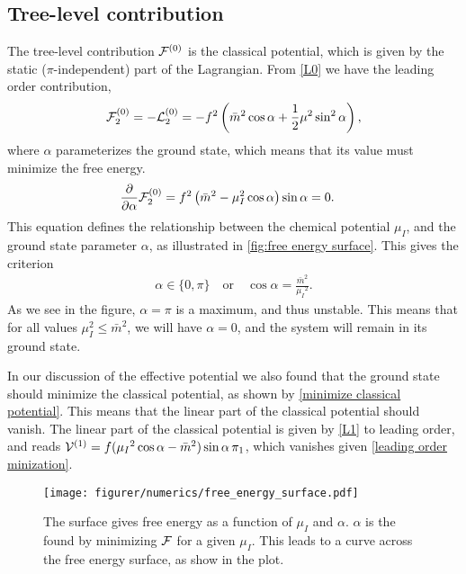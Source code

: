 \subsection*{Tree-level contribution}
The tree-level contribution $\mathcal{F}^{(0)}$ is the classical potential, which is given by the static ($\pi$-independent) part of the Lagrangian.
From \cref{L0} we have the leading order contribution,
\begin{equation}
    \label{leading order contribution free energy}
    \mathcal{F}_2^{(0)}
    = - \mathcal{L}_2^{(0)} 
    = 
    -f^2   
    \left(
        \bar m^2 \cos{\alpha}
        + \frac{1}{2} \mu^2 \sin^2{\alpha}
    \right),
\end{equation}
where $\alpha$ parameterizes the ground state, which means that its value must minimize the free energy.
\begin{align*}
    &\diffp{}{\alpha} \Ef_2^{(0)} 
    = f^2\left(\bar m^2 - \mu_I^2\cos{\alpha}\right)\sin{\alpha}
    = 0.
\end{align*}
This equation defines the relationship between the chemical potential $\mu_I$, and the ground state parameter $\alpha$, as illustrated in \autoref{fig:free energy surface}.
This gives the criterion
\begin{align}
    \label{leading order minization}
    \alpha \in \{0, \pi\} \quad
    \mathrm{or} \quad
    \cos{\alpha} = \frac{\bar m^2}{\mu_I{}^2}.
\end{align}
As we see in the figure, $\alpha = \pi$ is a maximum, and thus unstable.
This means that for all values $\mu_I^2 \leq \bar m^2$, we will have $\alpha = 0$, and the system will remain in its ground state.

In our discussion of the effective potential we also found that the ground state should minimize the classical potential, as shown by \cref{minimize classical potential}.
This means that the linear part of the classical potential should vanish.
The linear part of the classical potential is given by \autoref{L1} to leading order, and reads $\mathcal{V}^{(1)} = f(\mu_I{}^2\cos{\alpha} - \bar m^2)\sin{\alpha} \, \pi_1 $, which vanishes given \cref{leading order minization}.
\begin{figure}[ht]
    \centering
    \texttt{[image: figurer/numerics/free\_energy\_surface.pdf]}
    \caption{The surface gives free energy as a function of $\mu_I$ and $\alpha$. $\alpha$ is the found by minimizing $\mathcal{F}$ for a given $\mu_I$. This leads to a curve across the free energy surface, as show in the plot.}
    \label{fig:free energy surface}
\end{figure}

